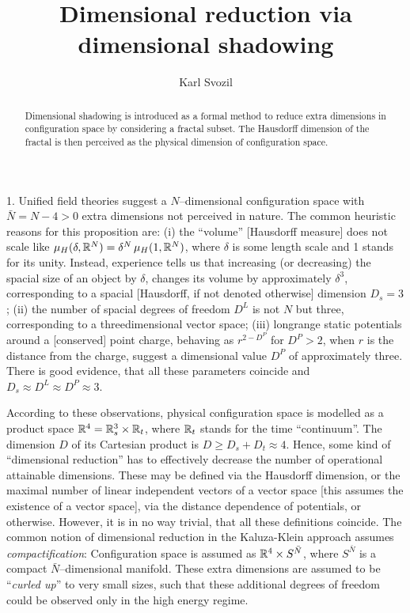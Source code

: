 \documentclass[pra,amssymb,twocolumn]{revtex4}
\begin{document}
\title{Dimensional reduction via dimensional shadowing}

\author{Karl Svozil}

\begin{abstract}
Dimensional shadowing is introduced as a formal method
to reduce extra dimensions in configuration space
by considering a fractal subset.
The Hausdorff dimension of the fractal is then perceived
as the physical dimension of configuration space.
\end{abstract}


\maketitle


1.
Unified field theories suggest a $N$--dimensional configuration
space with $\bar N=N-4>0$ extra dimensions not perceived in
nature.
The common heuristic reasons for this proposition are:
(i) the ``volume'' [Hausdorff measure] does not scale like
$\mu_H(\delta ,{\Bbb R}^N)=\delta^N\, \mu_H(1,{\Bbb R}^N)$,
where $\delta $ is some length scale and 1 stands for its unity.
Instead, experience tells us that increasing (or decreasing)
the spacial size of an object by $\delta $,
changes its volume by approximately $\delta^3$, corresponding
to a spacial [Hausdorff, if not denoted otherwise]
dimension $D_s=3$;
(ii) the number of spacial
degrees of freedom $D^L$ is not $N$ but three,
corresponding to a threedimensional vector space;
(iii) longrange static potentials around a [conserved] point
charge, behaving as $r^{2-D^P}$ for $D^P>2$, when $r$ is the
distance from the charge, suggest a
dimensional value $D^P$ of approximately three.
There is good evidence, that all these parameters
coincide and $D_s\approx D^L\approx D^P\approx 3$.


According to these observations, physical configuration space
is modelled as a product space ${\Bbb R}^4={\Bbb R}^3_s\times {\Bbb R}_t$,
where ${\Bbb R}_t$ stands for the time ``continuum''.
The dimension $D$  of its Cartesian product is \cite{falconer1}
$D\ge D_s+D_t\approx 4$.
Hence,
some kind of ``dimensional reduction'' has to effectively decrease the
number of operational attainable dimensions.
These may be defined via the Hausdorff dimension, or the
maximal number of linear independent vectors of a vector space
[this assumes the existence of a vector space], via the distance dependence of potentials, or otherwise.
However, it is in no way trivial, that all these definitions coincide.
The common notion of dimensional reduction in the Kaluza-Klein approach assumes
{\it compactification}:
Configuration space is assumed as ${\Bbb R}^4\times S^{\bar N}$,
where $S^{\bar N}$ is a compact $\bar N$--dimensional
manifold.
These
extra dimensions are assumed to be ``{\it curled up}''
to very small sizes, such that these additional degrees
of freedom could be observed only in the high energy regime.
\end{document}
